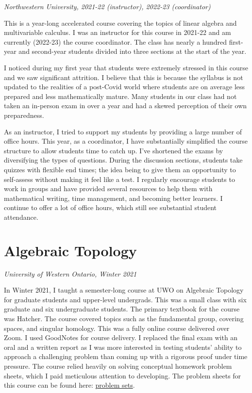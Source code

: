 \documentclass[
]{report}
\begin{document}
\emph{Northwestern University, 2021-22 (instructor), 2022-23 (coordinator)}

This is a year-long accelerated course covering the topics of linear algebra and multivariable calculus. I was an instructor for this course in 2021-22 and am currently (2022-23) the course coordinator. The class has nearly a hundred first-year and second-year students divided into three sections at the start of the year.

I noticed during my first year that students were extremely stressed in this course and we saw significant attrition.
I believe that this is because the syllabus is not updated to the realities of a post-Covid world where students are on average less prepared and less mathematically mature.
Many students in our class had not taken an in-person exam in over a year and had a skewed perception of their own preparedness.

As an instructor, I tried to support my students by providing a large number of office hours.
This year, as a coordinator, I have substantially simplified the course structure to allow students time to catch up.
I've shortened the exams by diversifying the types of questions.
During the discussion sections, students take quizzes with flexible end times; the idea being to give them an opportunity to self-assess without making it feel like a test.
I regularly encourage students to work in groups and have provided several resources to help them with mathematical writing, time management, and becoming better learners.
I continue to offer a lot of office hours, which still see substantial student attendance.

\hypertarget{algebraic-topology}{%
\section{Algebraic Topology}\label{algebraic-topology}}

\emph{University of Western Ontario, Winter 2021}

In Winter 2021, I taught a semester-long course at UWO on Algebraic Topology for graduate students and upper-level undergrads. This was a small class with six graduate and six undergraduate students. The primary textbook for the course was Hatcher. The course covered topics such as the fundamental group, covering spaces, and singular homology. This was a fully online course delivered over Zoom. I used GoodNotes for course delivery. I replaced the final exam with an oral and a written report as I was more interested in testing students' ability to approach a challenging problem than coming up with a rigorous proof under time pressure. The course relied heavily on solving conceptual homework problem sheets, which I paid meticulous attention to developing.
The problem sheets for this course can be found here: \href{https://github.com/apurvnakade/uwo2021-algebraic-topology/tree/main/output}{problem sets}.
\end{document}
